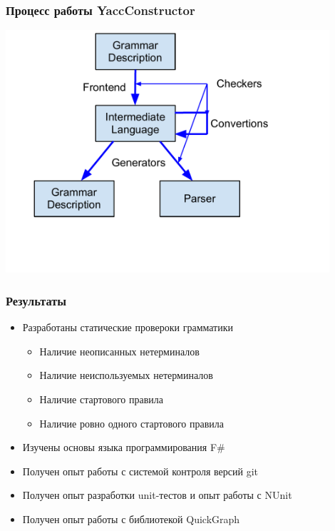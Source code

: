 \documentclass{beamer}
\begin{document}
\begin{frame}
	\transwipe[direction=90]
	\frametitle{Процесс работы YaccConstructor}
	\begin{center}
        {\includegraphics[width= 0.9\textwidth, height=\textheight]{diagrams/YC_workflow_with_checkers.pdf}}
    \end{center}
\end{frame}

\begin{frame}
	\transwipe[direction=90]
	\frametitle{Результаты}
	\begin{itemize}
        \item Разработаны статические провероки грамматики
	    \begin{itemize}
            \item Наличие неописанных нетерминалов
            \item Наличие неиспользуемых нетерминалов
            \item Наличие стартового правила
            \item Наличие ровно одного стартового правила
        \end{itemize}
        \item Изучены основы языка программирования F\#
        \item Получен опыт работы с системой контроля версий git
        \item Получен опыт разработки unit-тестов и опыт работы с NUnit
        \item Получен опыт работы с библиотекой QuickGraph
    \end{itemize}    
\end{frame}
    
\end{document}
